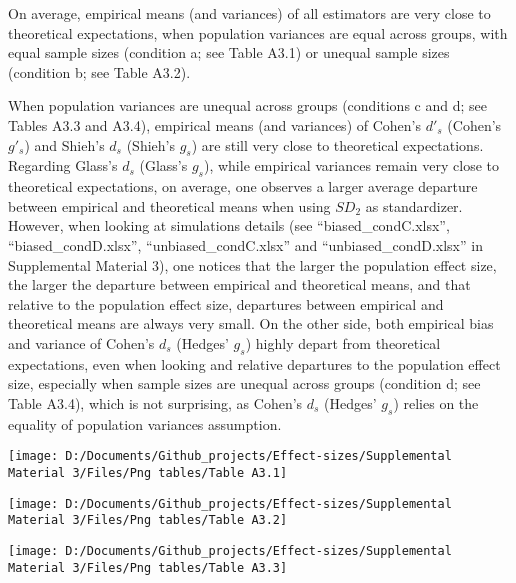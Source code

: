\documentclass[
  man]{apa6}
\begin{document}
On average, empirical means (and variances) of all estimators are very close to theoretical expectations, when population variances are equal across groups, with equal sample sizes (condition a; see Table A3.1) or unequal sample sizes (condition b; see Table A3.2).

When population variances are unequal across groups (conditions c and d; see Tables A3.3 and A3.4), empirical means (and variances) of Cohen's \(d'_s\) (Cohen's \(g'_s\)) and Shieh's \(d_s\) (Shieh's \(g_s\)) are still very close to theoretical expectations. Regarding Glass's \(d_s\) (Glass's \(g_s\)), while empirical variances remain very close to theoretical expectations, on average, one observes a larger average departure between empirical and theoretical means when using \(SD_2\) as standardizer. However, when looking at simulations details (see \enquote{biased\_condC.xlsx}, \enquote{biased\_condD.xlsx}, \enquote{unbiased\_condC.xlsx} and \enquote{unbiased\_condD.xlsx} in Supplemental Material 3), one notices that the larger the population effect size, the larger the departure between empirical and theoretical means, and that relative to the population effect size, departures between empirical and theoretical means are always very small. On the other side, both empirical bias and variance of Cohen's \(d_s\) (Hedges' \(g_s\)) highly depart from theoretical expectations, even when looking and relative departures to the population effect size, especially when sample sizes are unequal across groups (condition d; see Table A3.4), which is not surprising, as Cohen's \(d_s\) (Hedges' \(g_s\)) relies on the equality of population variances assumption.

\begin{sidewaysfigure}

{\centering \texttt{[image: D:/Documents/Github\_projects/Effect-sizes/Supplemental Material 3/Files/Png tables/Table A3.1]} 

}

\end{sidewaysfigure}

\begin{sidewaysfigure}

{\centering \texttt{[image: D:/Documents/Github\_projects/Effect-sizes/Supplemental Material 3/Files/Png tables/Table A3.2]} 

}

\end{sidewaysfigure}

\begin{sidewaysfigure}

{\centering \texttt{[image: D:/Documents/Github\_projects/Effect-sizes/Supplemental Material 3/Files/Png tables/Table A3.3]} 

}

\end{sidewaysfigure}
\end{document}
